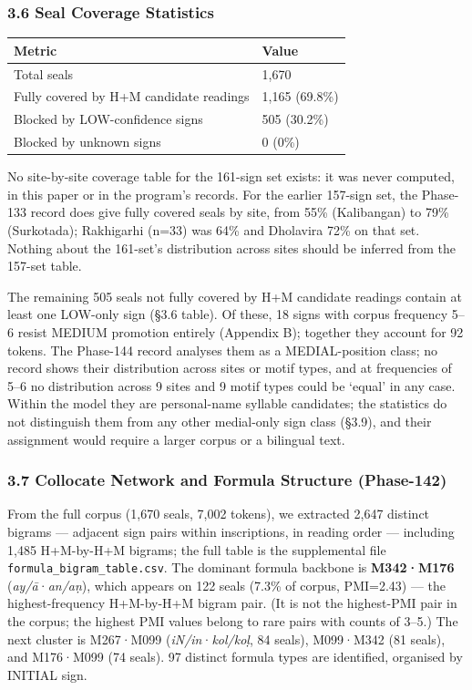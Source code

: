 \documentclass[
]{article}
\newcounter{none} %
\begin{document}
\subsubsection{3.6 Seal Coverage
Statistics}\label{seal-coverage-statistics}

{\def\LTcaptype{none} %
\begin{longtable}[]{@{}ll@{}}
\toprule\noalign{}
Metric & Value \\
\midrule\noalign{}
\endhead
\bottomrule\noalign{}
\endlastfoot
Total seals & 1,670 \\
Fully covered by H+M candidate readings & 1,165 (69.8\%) \\
Blocked by LOW-confidence signs & 505 (30.2\%) \\
Blocked by unknown signs & 0 (0\%) \\
\end{longtable}
}

No site-by-site coverage table for the 161-sign set exists: it was never computed, in this paper or in the program's records. For the earlier 157-sign set, the Phase-133 record does give fully covered seals by site, from 55\% (Kalibangan) to 79\% (Surkotada); Rakhigarhi (n=33) was 64\% and Dholavira 72\% on that set. Nothing about the 161-set's distribution across sites should be inferred from the 157-set table.

The remaining 505 seals not fully covered by H+M candidate readings contain at least one LOW-only sign (§3.6 table). Of these, 18 signs with corpus frequency 5--6 resist MEDIUM promotion entirely (Appendix B); together they account for 92 tokens. The Phase-144 record analyses them as a MEDIAL-position class; no record shows their distribution across sites or motif types, and at frequencies of 5--6 no distribution across 9 sites and 9 motif types could be `equal' in any case. Within the model they are personal-name syllable candidates; the statistics do not distinguish them from any other medial-only sign class (§3.9), and their assignment would require a larger corpus or a bilingual text.

\subsubsection{3.7 Collocate Network and Formula Structure
(Phase-142)}\label{collocate-network-and-formula-structure-phase-142}

From the full corpus (1,670 seals, 7,002 tokens), we extracted 2,647 distinct bigrams --- adjacent sign pairs within inscriptions, in reading order --- including 1,485 H+M-by-H+M bigrams; the full table is the supplemental file \texttt{formula\_bigram\_table.csv}. The dominant formula backbone is \textbf{M342·M176} (\emph{ay/ā}·\emph{an/aṇ}), which appears on 122 seals (7.3\% of corpus, PMI=2.43) --- the highest-frequency H+M-by-H+M bigram pair. (It is not the highest-PMI pair in the corpus; the highest PMI values belong to rare pairs with counts of 3--5.) The next cluster is M267·M099
(\emph{iN/in}·\emph{kol/koḷ}, 84 seals), M099·M342 (81 seals), and
M176·M099 (74 seals). 97 distinct formula types are identified, organised by INITIAL sign.
\end{document}
